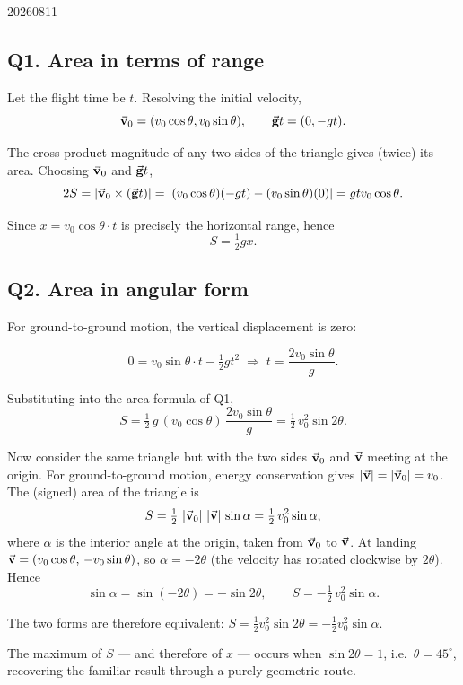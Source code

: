 \begin{solution}{20260811}

\subsection*{Q1. Area in terms of range}

Let the flight time be $t$.  Resolving the initial velocity,
\[
\vec{\mathbf{v}}_{0} = (v_{0}\cos\theta, v_{0}\sin\theta),
\qquad
\vec{\mathbf{g}}t = (0, -gt).
\]

The cross-product magnitude of any two sides of the triangle gives (twice) its area.  Choosing $\vec{\mathbf{v}}_{0}$ and $\vec{\mathbf{g}}t$,
\[
2S = \left\lvert \vec{\mathbf{v}}_{0} \times (\vec{\mathbf{g}}t) \right\rvert
    = \left\lvert (v_{0}\cos\theta)(-gt) - (v_{0}\sin\theta)(0) \right\rvert
    = gtv_{0}\cos\theta.
\]

Since $x = v_{0}\cos\theta \cdot t$ is precisely the horizontal range, hence
\[
\boxed{S = \tfrac{1}{2}gx}.
\]

\subsection*{Q2. Area in angular form}

For ground-to-ground motion, the vertical displacement is zero:

\[
0 = v_{0}\sin\theta \cdot t - \tfrac 1 2 gt^{2}
\;\Longrightarrow\;
t = \frac{2v_{0}\sin\theta}{g}.
\]

Substituting into the area formula of Q1,
\[
S = \tfrac{1}{2}\,g\,(v_{0}\cos\theta)\,
      \frac{2v_{0}\sin\theta}{g}
  = \boxed{\tfrac{1}{2}\,v_{0}^{2}\sin 2\theta}.
\]

Now consider the same triangle but with the two sides $\vec{\mathbf{v}}_{0}$ and
$\vec{\mathbf{v}}$ meeting at the origin.  For ground-to-ground motion, energy
conservation gives $\left\lvert \vec{\mathbf{v}} \right\rvert = \left\lvert \vec{\mathbf{v}}_{0} \right\rvert = v_{0}$.  The
(signed) area of the triangle is
\[
S = \tfrac{1}{2}\,\left\lvert \vec{\mathbf{v}}_{0} \right\rvert\,\left\lvert \vec{\mathbf{v}} \right\rvert\,\sin\alpha
  = \tfrac{1}{2}\,v_{0}^{2}\sin\alpha,
\]
where $\alpha$ is the interior angle at the origin, taken from $\vec{\mathbf{v}}_{0}$
to $\vec{\mathbf{v}}$.  At landing $\vec{\mathbf{v}} = (v_{0}\cos\theta,\,-v_{0}\sin\theta)$,
so $\alpha = -2\theta$ (the velocity has rotated clockwise by $2\theta$).
Hence
\[
\sin\alpha = \sin(-2\theta) = -\sin 2\theta,
\qquad
S = -\tfrac{1}{2}\,v_{0}^{2}\sin\alpha.
\]

The two forms are therefore equivalent:  $\boxed{S
= \tfrac{1}{2}v_{0}^{2}\sin 2\theta
= -\tfrac{1}{2}v_{0}^{2}\sin\alpha}$.

The maximum of $S$ --- and therefore of $x$ --- occurs when $\sin 2\theta = 1$,
i.e.\ $\boxed{\theta = 45^{\circ}}$, recovering the familiar result through a
purely geometric route.


\end{solution}
